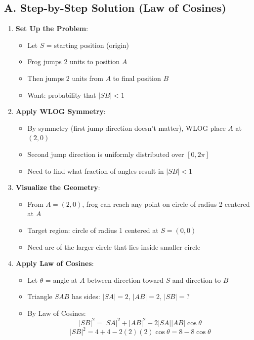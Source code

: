 \documentclass[12pt]{article}
\begin{document}
\begin{solutionbox}
\subsection*{A. Step-by-Step Solution (Law of Cosines)}
\begin{enumerate}[leftmargin=*]
    \item \textbf{Set Up the Problem}: 
    \begin{itemize}
        \item Let $S$ = starting position (origin)
        \item Frog jumps 2 units to position $A$
        \item Then jumps 2 units from $A$ to final position $B$
        \item Want: probability that $|SB| < 1$
    \end{itemize}
    
    \item \textbf{Apply WLOG Symmetry}: 
    \begin{itemize}
        \item By symmetry (first jump direction doesn't matter), WLOG place $A$ at $(2, 0)$
        \item Second jump direction is uniformly distributed over $[0, 2\pi]$
        \item Need to find what fraction of angles result in $|SB| < 1$
    \end{itemize}
    
    \item \textbf{Visualize the Geometry}: 
    \begin{itemize}
        \item From $A = (2, 0)$, frog can reach any point on circle of radius 2 centered at $A$
        \item Target region: circle of radius 1 centered at $S = (0, 0)$
        \item Need arc of the larger circle that lies inside smaller circle
    \end{itemize}
    
    \item \textbf{Apply Law of Cosines}: 
    \begin{itemize}
        \item Let $\theta$ = angle at $A$ between direction toward $S$ and direction to $B$
        \item Triangle $SAB$ has sides: $|SA| = 2$, $|AB| = 2$, $|SB| = ?$
        \item By Law of Cosines:
        \[|SB|^2 = |SA|^2 + |AB|^2 - 2|SA||AB|\cos\theta\]
        \[|SB|^2 = 4 + 4 - 2(2)(2)\cos\theta = 8 - 8\cos\theta\]
    \end{itemize}
    

\end{enumerate}
\end{solutionbox}
\end{document}
